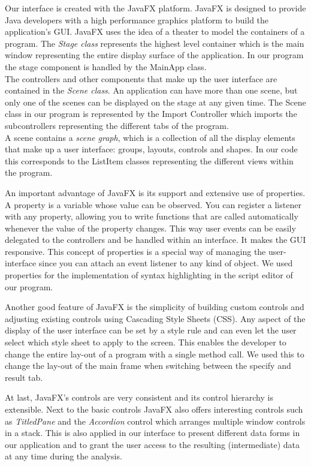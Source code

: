 \documentclass[a4paper,english,fleqn]{exam}
\begin{document}
Our interface is created with the JavaFX platform. JavaFX is designed to provide Java developers with a high performance graphics platform to build the application's GUI. JavaFX uses the idea of a theater to model the containers of a program. The \emph{Stage class} represents the highest level container which is the main window representing the entire display surface of the application. In our program the stage component is handled by the MainApp class. \\
The controllers and other components that make up the user interface are contained in the \emph{Scene class}. An application can have more than one scene, but only one of the scenes can be displayed on the stage at any given time. The Scene class in our program is represented by the Import Controller which imports the subcontrollers representing the different tabs of the program. \\
A scene contains a \emph{scene graph}, which is a collection of all the display elements that make up a user interface: groups, layouts, controls and shapes. In our code this corresponds to the ListItem classes representing the different views within the program.


An important advantage of JavaFX is its support and extensive use of properties. A property is a variable whose value can be observed. You can register a listener with any property, allowing you to write functions that are called automatically whenever the value of the property changes. This way user events can be easily delegated to the controllers and be handled within an interface. It makes the GUI responsive. This concept of properties is a special way of managing the user-interface since you can attach an event listener to any kind of object. We used properties for the implementation of syntax highlighting in the script editor of our program.

Another good feature of JavaFX is the simplicity of building custom controls and adjusting existing controls using Cascading Style Sheets (CSS). Any aspect of the display of the user interface can be set by a style rule and can even let the user select which style sheet to apply to the screen. This enables the developer to change the entire lay-out of a program with a single method call. We used this to change the lay-out of the main frame when switching between the specify and result tab.

At last, JavaFX's controls are very consistent and its control hierarchy is extensible. Next to the basic controls JavaFX also offers interesting controls such as \emph{TitledPane} and the \emph{Accordion} control which arranges multiple window controls in a stack. This is also applied in our interface to present different data forms in our application and to grant the user access to the resulting (intermediate) data at any time during the analysis.
\end{document}
